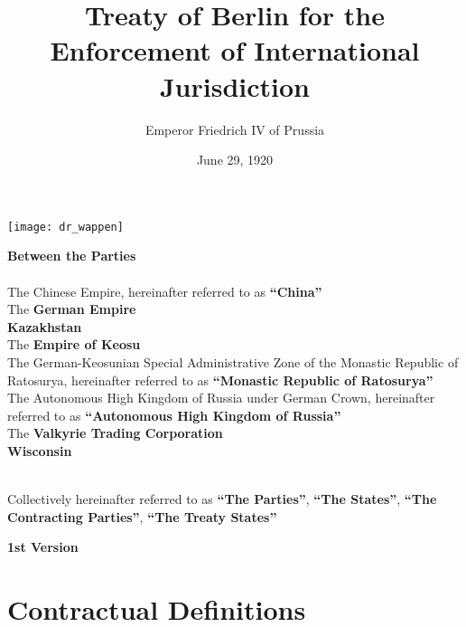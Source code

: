 \documentclass{article}
\title{Treaty of Berlin for the Enforcement of International Jurisdiction}
\author{Emperor Friedrich IV of Prussia}
\date{June 29, 1920}
\begin{document}
\maketitle
\begin{center}
    \texttt{[image: dr\_wappen]}
\end{center}
\begin{center}
    \textbf{Between the Parties\\}\textbf{\\}
    The Chinese Empire, hereinafter referred to as \textbf{``China''\\}
    The \textbf{German Empire\\}
    \textbf{Kazakhstan\\}
    The \textbf{Empire of Keosu\\}
    The German-Keosunian Special Administrative Zone of the Monastic Republic of Ratosurya, hereinafter referred to as \textbf{``Monastic Republic of Ratosurya''\\}
    The Autonomous High Kingdom of Russia under German Crown, hereinafter referred to as \textbf{``Autonomous High Kingdom of Russia''\\}
    The \textbf{Valkyrie Trading Corporation\\}
    \textbf{Wisconsin\\}\textbf{\\}

    Collectively hereinafter referred to as \textbf{``The Parties''}, \textbf{``The States''}, \textbf{``The Contracting Parties''}, \textbf{``The Treaty States''}
\end{center}
\newpage
{}
\vspace*{\fill}
\begin{Center}
\textbf{1st Version}
\vspace*{\fill}
\end{Center}
\newpage
\tableofcontents
\newpage
\section{Contractual Definitions}
\end{document}
